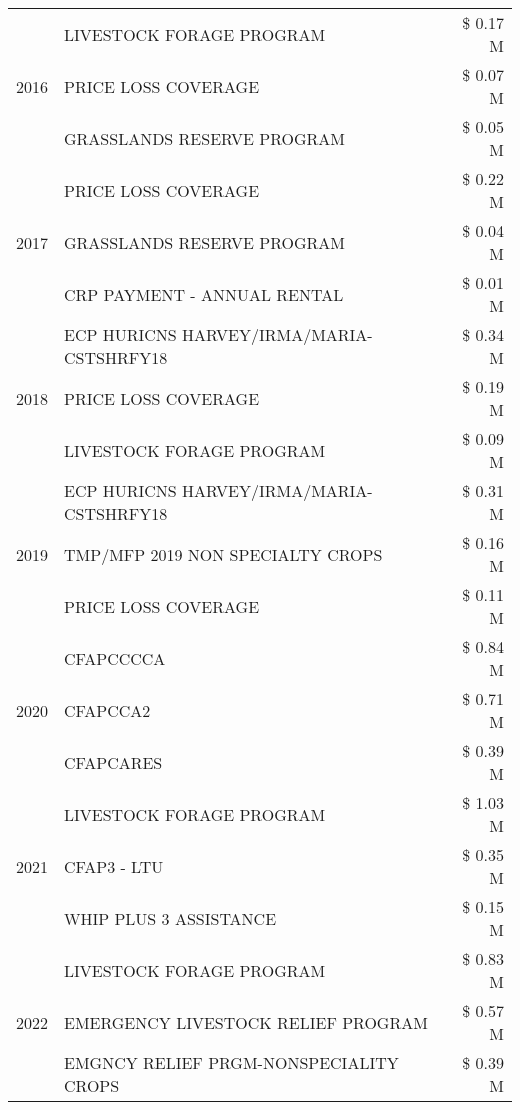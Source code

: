 \begin{tabular}{llr}
\cline{1-3}
\multirow[t]{3}{*}{2016} & LIVESTOCK FORAGE PROGRAM & \$ 0.17 M \\
 & PRICE LOSS COVERAGE & \$ 0.07 M \\
 & GRASSLANDS RESERVE PROGRAM & \$ 0.05 M \\
\cline{1-3}
\multirow[t]{3}{*}{2017} & PRICE LOSS COVERAGE & \$ 0.22 M \\
 & GRASSLANDS RESERVE PROGRAM & \$ 0.04 M \\
 & CRP PAYMENT - ANNUAL RENTAL & \$ 0.01 M \\
\cline{1-3}
\multirow[t]{3}{*}{2018} & ECP HURICNS HARVEY/IRMA/MARIA-CSTSHRFY18 & \$ 0.34 M \\
 & PRICE LOSS COVERAGE & \$ 0.19 M \\
 & LIVESTOCK FORAGE PROGRAM & \$ 0.09 M \\
\cline{1-3}
\multirow[t]{3}{*}{2019} & ECP HURICNS HARVEY/IRMA/MARIA-CSTSHRFY18 & \$ 0.31 M \\
 & TMP/MFP 2019 NON SPECIALTY CROPS & \$ 0.16 M \\
 & PRICE LOSS COVERAGE & \$ 0.11 M \\
\cline{1-3}
\multirow[t]{3}{*}{2020} & CFAPCCCCA & \$ 0.84 M \\
 & CFAPCCA2 & \$ 0.71 M \\
 & CFAPCARES & \$ 0.39 M \\
\cline{1-3}
\multirow[t]{3}{*}{2021} & LIVESTOCK FORAGE PROGRAM & \$ 1.03 M \\
 & CFAP3 - LTU & \$ 0.35 M \\
 & WHIP PLUS 3 ASSISTANCE & \$ 0.15 M \\
\cline{1-3}
\multirow[t]{3}{*}{2022} & LIVESTOCK FORAGE PROGRAM & \$ 0.83 M \\
 & EMERGENCY LIVESTOCK RELIEF PROGRAM & \$ 0.57 M \\
 & EMGNCY RELIEF PRGM-NONSPECIALITY CROPS & \$ 0.39 M \\
\cline{1-3}
\bottomrule
\end{tabular}
